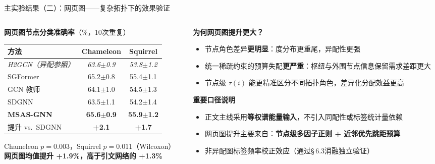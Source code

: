 \documentclass[aspectratio=169,9pt,xcolor=dvipsnames]{beamer}
\newcommand{\highlight}[1]{\textcolor{myred}{\textbf{#1}}}
\newcommand{\blue}[1]{\textcolor{mynavy}{#1}}
\newcommand{\green}[1]{\textcolor{mygreen}{#1}}
\begin{document}
\begin{frame}{主实验结果（二）：网页图——复杂拓扑下的效果验证}
  \begin{columns}[T]
    \begin{column}{0.50\textwidth}
      \textbf{\blue{网页图节点分类准确率}}（\%，10次重复）
      \begin{center}\small
      \begin{tabular}{lcc}
        \toprule
        \textbf{方法} & \textbf{Chameleon} & \textbf{Squirrel}\\
        \midrule
        \textit{H2GCN（异配参照）}
                      & \textit{63.6$\pm$0.9} & \textit{53.8$\pm$1.2}\\
        SGFormer      & 65.2$\pm$0.8 & 55.4$\pm$1.1\\
        \midrule
        GCN 教师      & 64.1$\pm$1.0 & 54.5$\pm$1.3\\
        SDGNN         & 63.5$\pm$1.1 & 54.2$\pm$1.4\\
        \textbf{MSAS-GNN}
                      & \textbf{65.6$\pm$0.9} & \textbf{55.9$\pm$1.2}\\
        \midrule
        \green{提升 vs.\ SDGNN}
                      & \green{\textbf{+2.1}} & \green{\textbf{+1.7}}\\
        \bottomrule
      \end{tabular}
      \end{center}
      \vspace{0.05cm}
      \footnotesize Chameleon $p\!=\!0.003$，Squirrel $p\!=\!0.011$（Wilcoxon）\\
      \textbf{网页图均值提升 \green{+1.9\%}，高于引文网络的 +1.3\%}
    \end{column}

    \begin{column}{0.46\textwidth}
      \textbf{\blue{为何网页图提升更大？}}
      \begin{itemize}
        \item 节点角色差异\textbf{更明显}：度分布更重尾，异配性更强
        \item 统一稀疏约束的预算失配\textbf{更严重}：枢纽与外围节点信息保留需求差距更大
        \item 节点级 $\tau(i)$ 能更精准区分不同拓扑角色，差异化分配效益更高
      \end{itemize}

      \vspace{0.2cm}
      \textbf{\highlight{重要口径说明}}
      \begin{itemize}
        \item 正文主线采用\textbf{等权谱能量输入}，不引入同配性或标签统计量依赖
        \item 网页图提升主要来自：\textbf{节点级多因子正则 + 近邻优先跳距预算}
        \item 非异配图标签频率校正效应（通过§\,6.3消融独立验证）
      \end{itemize}


\end{column}
\end{columns}
\end{frame}
\end{document}
